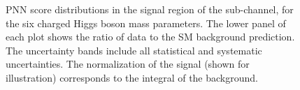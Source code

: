 \begin{figure}
		\caption{\label{fig:taulepPNNscoreSR2_body} PNN score distributions in the
		signal region of the \taumu sub-channel, for the six charged Higgs boson mass parameters.
		The lower panel of each plot shows the ratio of data to the SM background prediction. The uncertainty bands include all statistical and systematic uncertainties.
		The normalization of the signal (shown for illustration) corresponds to the integral of the background.}
		\end{figure}

